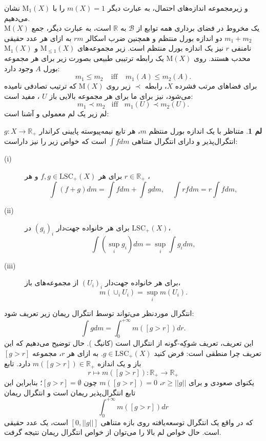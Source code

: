 \documentclass[12pt,a4paper]{article}
\theoremstyle{definition}
\theoremstyle{theorem}
\newtheorem{lemma}[definition]{لم}
\theoremstyle{definition}
\newcommand{\bR}{\mathbb{R}}
\newcommand{\cB}{\mathcal{B}}
\newcommand{\rM}{\mathrm{M}}
\newcommand{\ls}{\mathrm{LSC}_{+}(X)}
\begin{document}
و زیرمجموعه اندازه‌های احتمال، به عبارت دیگر
$ m(X)=1 $
را با 
$ \rM_{1}(X) $\index{$ \rM_{1}(X) $}
نشان 
\indent
می‌دهیم.\\
$ \rM(X) $
یک مخروط در فضای برداری همه توابع از 
$ \cB $
به 
$ \bR $
است، به عبارت دیگر، جمع 
$ m_{1}+m_{2} $
 دو اندازه بورل منتظم و همچنین ضرب اسکالر 
$ rm $
به ازای هر عدد حقیقی نامنفی 
$ r $
نیز یک اندازه بورل منتظم است. زیر مجموعه‌های 
$ \rM_{\leq 1} (X)$
و
$ \rM_{1}(X) $
محدب هستند. روی 
$ \rM(X) $
یک رابطه ترتیبی طبیعی
 بصورت زیر برای هر مجموعه‌ بورل 
$ A $
 وجود دارد:
$$ m_{1}\leq m_{2}  \  \ \ \  \   \text{iff} \  \ \ \ \   m_{1}(A)\leq m_{2}(A). $$
برای فضاهای مرتب فشرده 
$ X $، رابطه 
$ \prec $
زیر روی 
$ \rM(X) $
که ترتیب تصادفی
 نامیده می‌شود، نیز  برای ما برای هر مجموعه‌ بالایی باز
$ U $%
، مفید است: 
$$ m_{1}\prec m_{2}  \ \ \ \    \text{iff} \ \ \ \    m_{1}(U)\prec m_{2}(U). $$
لم زیر یک لم معمولی و آشنا است:
\begin{lemma}\label{2.1} 
متناظر با یک اندازه بورل منتظم 
$ m $‌‌،  هر تابع نیمه‌پیوسته پایینی کراندار 
$ g:X\rightarrow \mathbb{R}_{+} $
انتگرال‌پذیر و دارای انتگرال متناهی   
$ \int{f} dm $
است که خواص زیر را نیز داراست:
\begin{description}
\item[(i)]
برای هر
$ f,g\in \ls  $
و هر
$ r\in \bR_{+} $%
،
 $$\int{(f+g)}dm=\int{f} dm+\int{g} dm, \ \ \ \ \ \int{rf}dm=r\int{f}dm,$$

\item[(ii)] 
برای هر خانواده جهت‌دار 
$ (g_{i})_{i} $
در
$ \ls $، 
 $$\int{(\sup_{i}g_{i})}dm=\sup_{i}\int{g_{i}}dm,$$
\item[(iii)]
برای هر خانواده جهت‌دار 
$ (U_{i})_{i} $
از مجموعه‌های باز،
 $$ m(\cup _{i} U_{i})=\sup_{i} m(U_{i}). $$
\end{description}

\end{lemma}

انتگرال موردنظر می‌تواند توسط انتگرال ریمان 
زیر تعریف شود:
$$ \int{g}dm= \int_{0}^{+ \infty}{m([g>r])}dr. $$
این تعریف، تعریف شوکِه-گونه 
از انتگرال است (کانیگ\cite{Konig}
 ). حال توضیح می‌دهیم که این تعریف چرا منطقی است: فرض کنید 
$ g\in \ls $. به ازای هر
$ r $، مجموعه 
$ [g>r] $
باز و یک اندازه 
$ m([g>r])\in \bR_{+} $
دارد. تابع 
$$  r\mapsto m([g>r]):\bR_{+}\rightarrow \bR_{+}$$
یکنوای صعودی  و برای 
$ r\geq ||g|| $،  
$  m([g>r])=0 $
چون $ [g>r]=\emptyset $؛ بنابراین این تابع انتگرال‌پذیر ریمان است و انتگرال ریمان 
$$ \int_{0}^{+ \infty}{m([g>r])}dr $$
که در واقع یک انتگرال توسعه‌یافته روی بازه متناهی 
$ \left[ 0,||g||\right]  $
است،  یک عدد حقیقی است. حال خواص لم بالا را می‌توان از خواص انتگرال ریمان نتیجه گرفت. 
\end{document}
